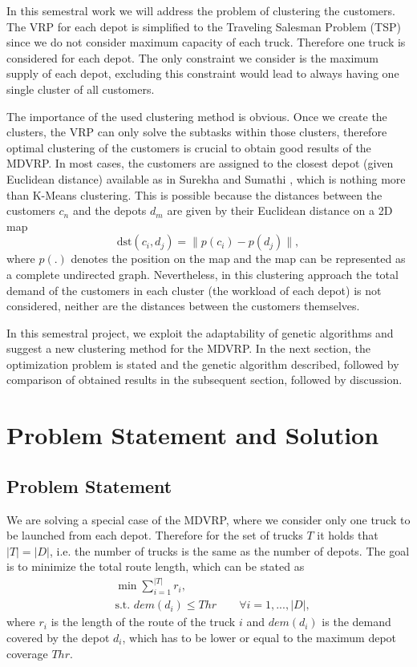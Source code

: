 \documentclass[conference]{IEEEtran}
\begin{document}
In this semestral work we will address the problem of clustering the customers. The VRP for each depot is simplified to the Traveling Salesman Problem (TSP) since we do not consider maximum capacity of each truck. Therefore one truck is considered for each depot. The only constraint we consider is the maximum supply of each depot, excluding this constraint would lead to always having one single cluster of all customers. 

The importance of the used clustering method is obvious. Once we create the clusters, the VRP can only solve the subtasks within those clusters, therefore optimal clustering of the customers is crucial to obtain good results of the MDVRP. In most cases, the customers are assigned to the closest depot (given Euclidean distance) available as in Surekha and Sumathi \cite{surekha2011solution}, which is nothing more than K-Means clustering. This is possible because the distances between the customers $c_n$ and the depots $d_m$ are given by their Euclidean distance on a 2D map
$$
\text{dst}(c_i, d_j) = \| p(c_i) - p(d_j) \|,
$$
where $p(.)$ denotes the position on the map and the map can be represented as a complete undirected graph. Nevertheless, in this clustering approach the total demand of the customers in each cluster (the workload of each depot) is not considered, neither are the distances between the customers themselves. 

In this semestral project, we exploit the adaptability of genetic algorithms and suggest a new clustering method for the MDVRP. In the next section, the optimization problem is stated and the genetic algorithm described, followed by comparison of obtained results in the subsequent section, followed by discussion.



\section{Problem Statement and Solution}

\subsection{Problem Statement}
We are solving a special case of the MDVRP, where we consider only one truck to be launched from each depot. Therefore for the set of trucks $T$ it holds that $|T| = |D|$, i.e. the number of trucks is the same as the number of depots. The goal is to minimize the total route length, which can be stated as
\begin{align*}
  &\min \sum_{i=1}^{|T|} r_{i}, \\
  &\text{s.t. } dem(d_i) \leq Thr \qquad \forall i = 1,...,|D|,
\end{align*}
where $r_{i}$ is the length of the route of the truck $i$ and $dem(d_i)$ is the demand covered by the depot $d_i$, which has to be lower or equal to the maximum depot coverage $Thr$.
\end{document}

